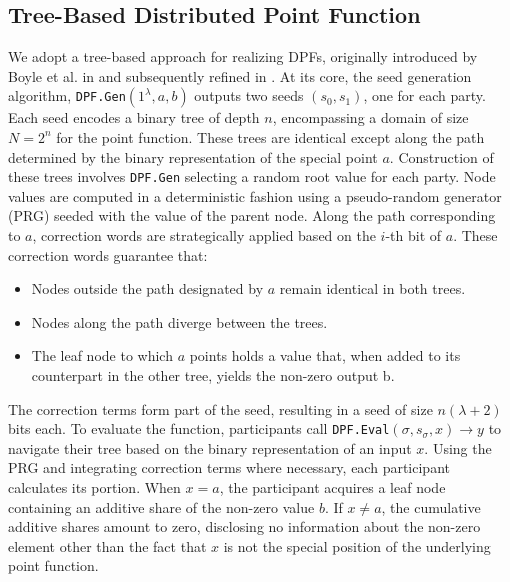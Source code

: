 \subsection{Tree-Based Distributed Point Function}
\label{subsec:treebasedDSPFsImpl}
We adopt a tree-based approach for realizing DPFs, originally introduced by Boyle et al. in \cite{boyle2015function} and subsequently refined in \cite{boyle2016function}. At its core, the seed generation algorithm, \texttt{DPF.Gen}$(1^\lambda, a, b)$ outputs two seeds $(s_0, s_1)$, one for each party. Each seed encodes a binary tree of depth $n$, encompassing a domain of size $N=2^n$ for the point function. These trees are identical except along the path determined by the binary representation of the special point $a$. Construction of these trees involves \texttt{DPF.Gen} selecting a random root value for each party. Node values are computed in a deterministic fashion using a pseudo-random generator (PRG) seeded with the value of the parent node. Along the path corresponding to $a$, correction words are strategically applied based on the $i$-th bit of $a$. These correction words guarantee that:
\begin{itemize}
\item Nodes outside the path designated by $a$ remain identical in both trees. 
\item Nodes along the path diverge between the trees.
\item The leaf node to which $a$ points holds a value that, when added to its counterpart in the other tree, yields the non-zero output b.
\end{itemize}
The correction terms form part of the seed, resulting in a seed of size $n(\lambda+2)$ bits each. To evaluate the function, participants call \texttt{DPF.Eval}$(\sigma, s_\sigma, x) \rightarrow y$ to navigate their tree based on the binary representation of an input $x$. Using the PRG and integrating correction terms where necessary, each participant calculates its portion. When $x=a$, the participant acquires a leaf node containing an additive share of the non-zero value $b$. If $x\neq a$, the cumulative additive shares amount to zero, disclosing no information about the non-zero element other than the fact that $x$ is not the special position of the underlying point function.

